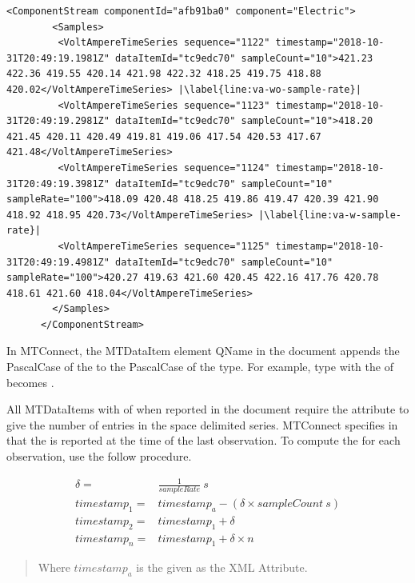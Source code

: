 \begin{lstlisting}[firstnumber=last,escapechar=|,%
    caption={Electric Component Time Series Example},label={lst:electric-timeseries}]
      <ComponentStream componentId="afb91ba0" component="Electric">
        <Samples>
         <VoltAmpereTimeSeries sequence="1122" timestamp="2018-10-31T20:49:19.1981Z" dataItemId="tc9edc70" sampleCount="10">421.23 422.36 419.55 420.14 421.98 422.32 418.25 419.75 418.88 420.02</VoltAmpereTimeSeries> |\label{line:va-wo-sample-rate}|
         <VoltAmpereTimeSeries sequence="1123" timestamp="2018-10-31T20:49:19.2981Z" dataItemId="tc9edc70" sampleCount="10">418.20 421.45 420.11 420.49 419.81 419.06 417.54 420.53 417.67 421.48</VoltAmpereTimeSeries>
         <VoltAmpereTimeSeries sequence="1124" timestamp="2018-10-31T20:49:19.3981Z" dataItemId="tc9edc70" sampleCount="10" sampleRate="100">418.09 420.48 418.25 419.86 419.47 420.39 421.90 418.92 418.95 420.73</VoltAmpereTimeSeries> |\label{line:va-w-sample-rate}|
         <VoltAmpereTimeSeries sequence="1125" timestamp="2018-10-31T20:49:19.4981Z" dataItemId="tc9edc70" sampleCount="10" sampleRate="100">420.27 419.63 421.60 420.45 422.16 417.76 420.78 418.61 421.60 418.04</VoltAmpereTimeSeries>
        </Samples>
      </ComponentStream>
\end{lstlisting}

In MTConnect, the \gls{MTDataItem} element \gls{QName} in the  document appends the \gls{PascalCase} of the  to the \gls{PascalCase} of the \gls{type}. For example, \gls{type}  with the  of  becomes . 

All \glspl{MTDataItem} with  of  when reported in the  document require the attribute  to give the number of entries in the space delimited series. MTConnect specifies in \cite{MTCPart3} that the  is reported at the time of the last observation. To compute the  for each observation, use the follow procedure.

\begin{align}
  \delta =& \frac{1}{sampleRate}\ s \label{eqn:ts-delta} \\
  timestamp_1 =& timestamp_a - (\delta \times sampleCount\ s) \label{eqn:ts-first} \\
  timestamp_2 =& timestamp_1 + \delta  \label{eqn:ts-second} \\
  timestamp_n =& timestamp_1 + \delta \times n \label{eqn:ts-n}
\end{align}
\begin{quote}
  Where $timestamp_a$ is the  given as the XML Attribute.
\end{quote}


